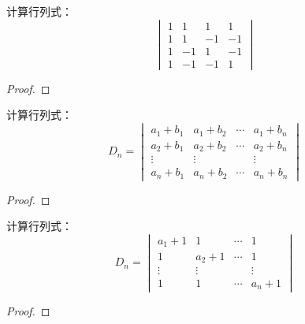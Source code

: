\begin{problem}
计算行列式：
\begin{equation*}
    \begin{vmatrix}
        1 & 1  & 1  & 1  \\
        1 & 1  & -1 & -1 \\
        1 & -1 & 1  & -1 \\
        1 & -1 & -1 & 1
    \end{vmatrix}
\end{equation*}
\end{problem}
\begin{proof}

\end{proof}

\begin{problem}
计算行列式：
\begin{equation*}
    D_n=
    \begin{vmatrix}
        a_{1}+b_{1} & a_{1}+b_{2} & \cdots & a_{1}+b_{n} \\
        a_{2}+b_{1} & a_{2}+b_{2} & \cdots & a_{2}+b_{n} \\
        \vdots      & \vdots      &        & \vdots      \\
        a_{n}+b_{1} & a_{n}+b_{2} & \cdots & a_{n}+b_{n}
    \end{vmatrix}
\end{equation*}
\end{problem}
\begin{proof}

\end{proof}

\begin{problem}
计算行列式：
\begin{equation*}
    D_n=
    \begin{vmatrix}
        a_1+1  & 1      & \cdots & 1      \\
        1      & a_2+1  & \cdots & 1      \\
        \vdots & \vdots &        & \vdots \\
        1      & 1      & \cdots & a_n+1
    \end{vmatrix}
\end{equation*}
\end{problem}
\begin{proof}
\end{proof}

